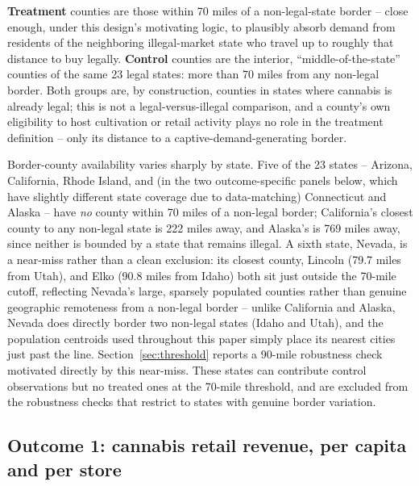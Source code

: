 ﻿\documentclass{article}
\begin{document}
\textbf{Treatment} counties are those within 70 miles of a non-legal-state border -- close enough, under
this design's motivating logic, to plausibly absorb demand from residents of the neighboring illegal-market
state who travel up to roughly that distance to buy legally. \textbf{Control} counties are the interior,
``middle-of-the-state'' counties of the same 23 legal states: more than 70 miles from any non-legal
border. Both groups are, by construction, counties in states where cannabis is already legal; this is not
a legal-versus-illegal comparison, and a county's own eligibility to host cultivation or retail activity
plays no role in the treatment definition -- only its distance to a captive-demand-generating border.

Border-county availability varies sharply by state. Five of the 23 states -- Arizona, California, Rhode
Island, and (in the two outcome-specific panels below, which have slightly different state coverage due to
data-matching) Connecticut and Alaska -- have \emph{no} county within 70 miles of a non-legal border;
California's closest county to any non-legal state is 222 miles away, and Alaska's is 769 miles away,
since neither is bounded by a state that remains illegal. A sixth state, Nevada, is a near-miss rather than
a clean exclusion: its closest county, Lincoln (79.7 miles from Utah), and Elko (90.8 miles from Idaho)
both sit just outside the 70-mile cutoff, reflecting Nevada's large, sparsely populated counties rather
than genuine geographic remoteness from a non-legal border -- unlike California and Alaska, Nevada does
directly border two non-legal states (Idaho and Utah), and the population centroids used throughout this
paper simply place its nearest cities just past the line. Section~\ref{sec:threshold} reports a 90-mile
robustness check motivated directly by this near-miss. These states can contribute control observations
but no treated ones at the 70-mile threshold, and are excluded from the robustness checks that restrict to
states with genuine border variation.

\subsection{Outcome 1: cannabis retail revenue, per capita and per store}
\label{sec:data_revenue}
\end{document}
